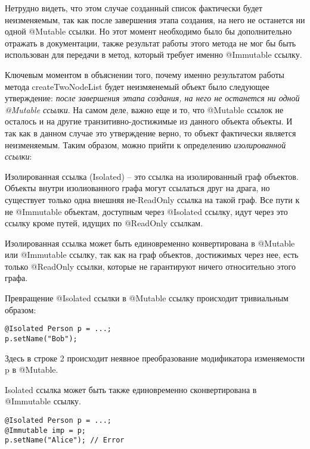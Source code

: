 Нетрудно видеть, что этом случае созданный список фактически будет неизменяемым, так как после завершения этапа создания, на него не останется ни одной @Mutable ссылки. Но этот момент необходимо было бы дополнительно отражать в документации, также результат работы этого метода не мог бы быть использован для передачи в метод, который требует именно @Immutable ссылку. 

Ключевым моментом в объяснении того, почему именно результатом работы метода createTwoNodeList будет неизмяенемый объект было следующее утверждение: \textit{после завершения этапа создания, на него не останется ни одной @Mutable ссылки}. На самом деле, важно еще и то, что @Mutable ссылок не осталось и на другие транзитивно-достижимые из данного объекта объекты. И так как в данном случае это утверждение верно, то объект фактически является неизменяемым. Таким образом, можно прийти к определению \textit{изолированной ссылки}:

\begin{Def}\label{isolated_ref}
Изолированная ссылка (Isolated) -- это ссылка на изолированный граф объектов. Объекты внутри изолиованного графа могут ссылаться друг на драга, но существует только одна внешняя не-ReadOnly ссылка на такой граф. Все пути к не @Immutable объектам, доступным через @Isolated ссылку, идут через это ссылку кроме путей, идущих по @ReadOnly ссылкам.
\end{Def}

Изолированная ссылка может быть единовременно конвертирована в @Mutable или @Immutable ссылку, так как на граф объектов, достижимых через нее, есть только @ReadOnly ссылки, которые не гарантируют ничего относительно этого графа. 

Превращение @Isolated ссылки в @Mutable ссылку происходит тривиальным образом:

\begin{lstlisting}[caption=Превращение @Isolated ссылки в @Mutable, label=code:isolated_to_mutable]
@Isolated Person p = ...;
p.setName("Bob");
\end{lstlisting} 

Здесь в строке 2 происходит неявное преобразование модификатора изменяемости p в @Mutable.

Isolated ссылка может быть также единовременно сконвертирована в @Immutable ссылку.

\begin{lstlisting}[caption=Превращение @Isolated ссылки в @Immutable, label=code:isolated_to_immutable]
@Isolated Person p = ...;
@Immutable imp = p;
p.setName("Alice"); // Error
\end{lstlisting} 

